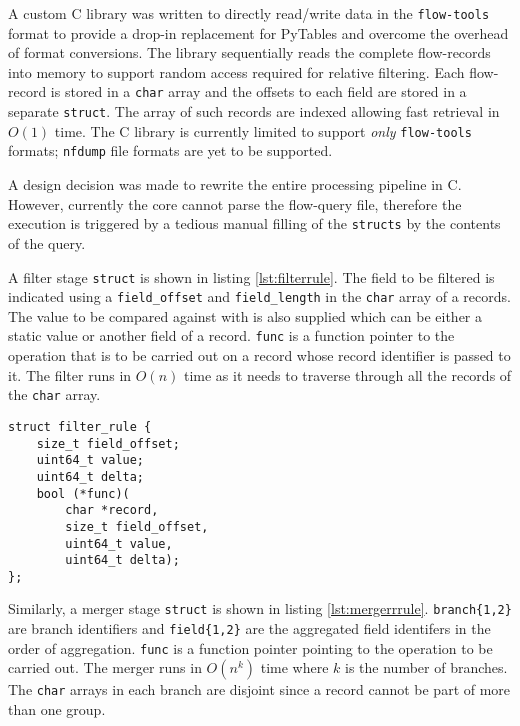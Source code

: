 A custom C library was written to directly read/write data in the
\texttt{flow-tools} format to provide a drop-in replacement for PyTables and
overcome the overhead of format conversions. The library sequentially reads
the complete flow-records into memory to support random access required for
relative filtering.  Each
flow-record is stored in a \texttt{char} array and the offsets to each field
are stored in a separate \texttt{struct}. The array of such records are
indexed allowing fast retrieval in $O(1)$ time. The C library is currently
limited to support \emph{only} \texttt{flow-tools} formats; \texttt{nfdump}
file formats are yet to be supported.

A design decision was made to rewrite the entire processing pipeline in C.
However, currently the core cannot parse the flow-query file, therefore the
execution is triggered by a tedious manual filling of the \texttt{structs} by
the contents of the query.

A filter stage \texttt{struct} is shown in listing \ref{lst:filterrule}. The
field to be filtered is indicated using a \texttt{field\_offset} and
\texttt{field\_length} in the \texttt{char} array of a records. The value to
be compared against with is also supplied which can be either a
 static value or another field of a record.
\texttt{func} is a function pointer to the operation that is to be carried out
on a record whose record identifier is passed to it. The filter runs in $O(n)$
time as it needs to traverse through all the records of the \texttt{char}
array.

\begin{lstlisting}
struct filter_rule {
	size_t field_offset;
	uint64_t value;
	uint64_t delta;
	bool (*func)(
		char *record,
		size_t field_offset,
		uint64_t value,
		uint64_t delta);
};
\end{lstlisting}

Similarly, a merger stage \texttt{struct} is shown in listing
\ref{lst:mergerrrule}. \texttt{branch\{1,2\}} are branch identifiers and
\texttt{field\{1,2\}} are the aggregated field identifers in the order of
aggregation. \texttt{func} is a function pointer pointing to the operation to
be carried out. The merger  runs in $O(n^k)$
time where $k$ is the number of branches. The \texttt{char} arrays in each
branch are disjoint since a record cannot be part of more than one group.

